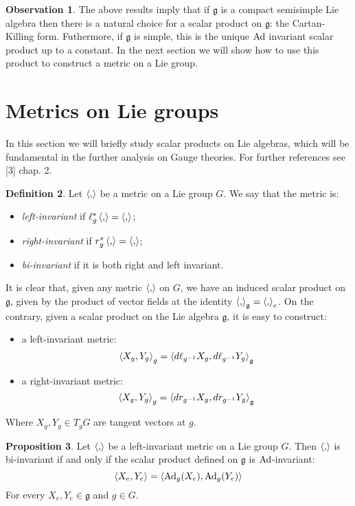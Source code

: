 \documentclass[12pt,a4paper]{report}
\theoremstyle{definition}
\newtheorem{Def}{Definition}[chapter]
\theoremstyle{Theorem}
\newtheorem{Prop}[Def]{Proposition}
\theoremstyle{definition}
\theoremstyle{definition}
\newtheorem{Obs}[Def]{Observation}
\begin{document}
	\begin{Obs} \label{Obs_2.9.1}
		The above results imply that if $\mathfrak{g}$ is a compact semisimple Lie algebra then there is a natural choice for a scalar product on $\mathfrak{g}$: the Cartan-Killing form. Futhermore, if $\mathfrak{g}$ is simple, this is the unique $\hbox{Ad}$ invariant scalar product up to a constant. In the next section we will show how to use this product to construct a metric on a Lie group.
	\end{Obs}
	\section{Metrics on Lie groups}
	In this section we will briefly study scalar products on Lie algebras, which will be fundamental in the further analysis on Gauge theories. For further references see [3] chap. 2.
	\begin{Def}
		Let $\braket{,}$ be a metric on a Lie group $G$. We say that the metric is:
		\begin{itemize}
			\item \textit{left-invariant} if $\ell^*_g\braket{,}=\braket{,}$;
			\item \textit{right-invariant} if $r^*_g\braket{,}=\braket{,}$;
			\item \textit{bi-invariant} if it is both right and left invariant.
		\end{itemize}
	\end{Def}
	It is clear that, given any metric $\braket{,}$ on $G$, we have an induced scalar product on $\mathfrak{g}$, given by the product of vector fields at the identity $\braket{,}_\mathfrak{g}=\braket{,}_e$. On the contrary, given a scalar product on the Lie algebra $\mathfrak{g}$, it is easy to construct:
	\begin{itemize}
		\item a left-invariant metric:
		$$\braket{X_g,Y_g}_g=\braket{d\ell_{g^{-1}}X_g,d\ell_{g^{-1}}Y_g}_\mathfrak{g}$$
		\item a right-invariant metric:
		$$\braket{X_g,Y_g}_g=\braket{dr_{g^{-1}}X_g,dr_{g^{-1}}Y_g}_\mathfrak{g}$$
	\end{itemize}
	Where $X_g,Y_g\in T_gG$ are tangent vectors at $g$.
	\begin{Prop}
		Let $\braket{,}$ be a left-invariant metric on a Lie group $G$. Then $\braket{,}$ is bi-invariant if and only if the scalar product defined on $\mathfrak{g}$ is $\hbox{Ad}$-invariant:
		$$\braket{X_e,Y_e}=\braket{\hbox{Ad}_g(X_e),\hbox{Ad}_g(Y_e)}$$
		For every $X_e,Y_e\in\mathfrak{g}$ and $g\in G$.
	\end{Prop}
\end{document}

